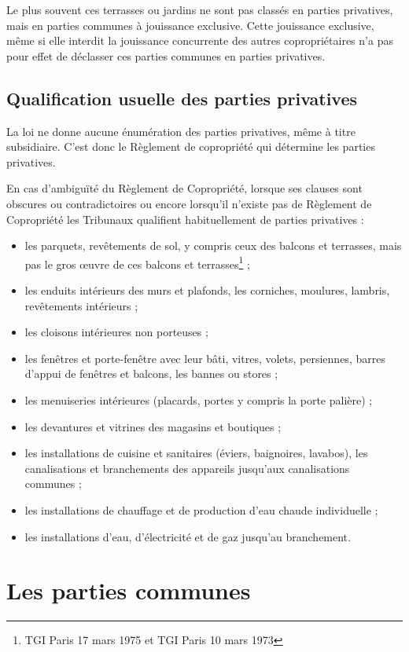 		Le plus souvent ces terrasses ou jardins ne sont pas classés en parties privatives, mais en parties communes
		à jouissance exclusive. Cette jouissance exclusive, même si elle interdit la jouissance concurrente des
		autres copropriétaires n'a pas pour effet de déclasser ces parties communes en parties privatives.
	
	\subsection{Qualification usuelle des parties privatives}
		La loi ne donne aucune énumération des parties privatives, même à titre subsidiaire. C'est donc le
		Règlement de copropriété qui détermine les parties privatives.
		
		En cas d'ambiguïté du Règlement de Copropriété, lorsque ses clauses sont obscures ou contradictoires ou
		encore lorsqu'il n'existe pas de Règlement de Copropriété les Tribunaux qualifient habituellement de
		parties privatives :
		\begin{itemize}
			\item les parquets, revêtements de sol, y compris ceux des balcons et terrasses, mais pas le gros œuvre de ces balcons et terrasses\footnote{TGI Paris 17 mars 1975 et TGI Paris 10 mars 1973} ;
			\item les enduits intérieurs des murs et plafonds, les corniches, moulures, lambris, revêtements
			intérieurs ;
			\item les cloisons intérieures non porteuses ;
			\item les fenêtres et porte-fenêtre avec leur bâti, vitres, volets, persiennes, barres d'appui de
			fenêtres et balcons, les bannes ou stores ;
			\item les menuiseries intérieures (placards, portes y compris la porte palière) ;
			\item les devantures et vitrines des magasins et boutiques ;
			\item les installations de cuisine et sanitaires (éviers, baignoires, lavabos), les canalisations et
			branchements des appareils jusqu'aux canalisations communes ;
			\item les installations de chauffage et de production d'eau chaude individuelle ;
			\item les installations d'eau, d'électricité et de gaz jusqu'au branchement.
		\end{itemize}

\section{Les parties communes}

